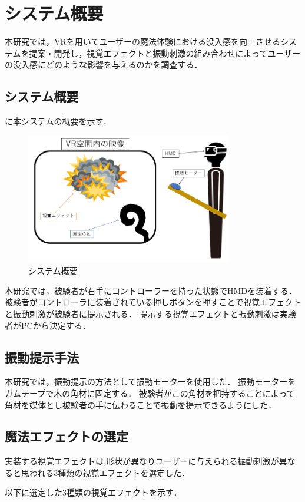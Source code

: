 \chapter{システム概要}
本研究では，VRを用いてユーザーの魔法体験における没入感を向上させるシステムを提案・開発し，視覚エフェクトと振動刺激の組み合わせによってユーザーの没入感にどのような影響を与えるのかを調査する．

\section{システム概要}
に本システムの概要を示す．
\begin{figure}[h]
\centering
\includegraphics[clip,width=9cm]{./fig/allsystem.png}
\caption{システム概要}\label{allsystem}
\end{figure}

本研究では，被験者が右手にコントローラーを持った状態でHMDを装着する．
被験者がコントローラに装着されている押しボタンを押すことで視覚エフェクトと振動刺激が被験者に提示される．
提示する視覚エフェクトと振動刺激は実験者がPCから決定する．

\section{振動提示手法}
本研究では，振動提示の方法として振動モーターを使用した．
振動モーターをガムテープで木の角材に固定する．
被験者がこの角材を把持することによって角材を媒体とし被験者の手に伝わることで振動を提示できるようにした．

\section{魔法エフェクトの選定}
実装する視覚エフェクトは,形状が異なりユーザーに与えられる振動刺激が異なると思われる3種類の視覚エフェクトを選定した．

以下に選定した3種類の視覚エフェクトを示す．

